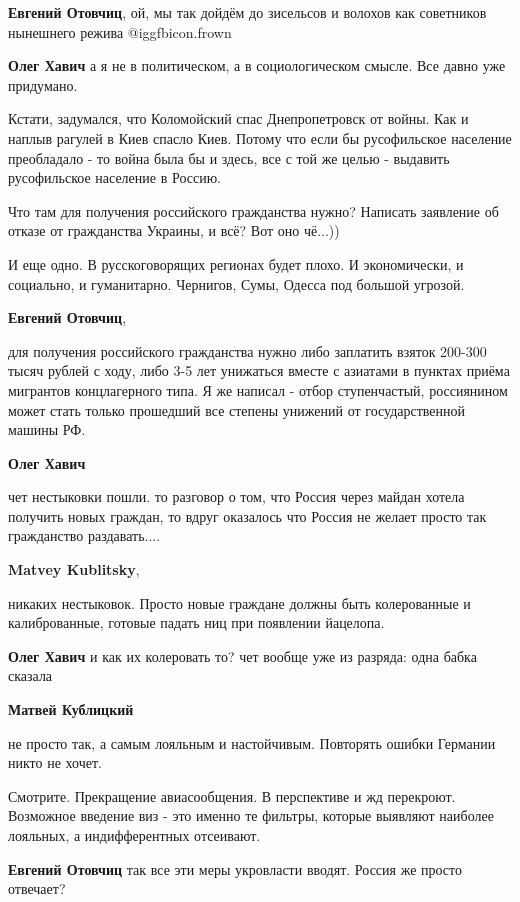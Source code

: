 \begin{itemize}
\begin{itemize}
\textbf{Евгений Отовчиц}, ой, мы так дойдём до зисельсов и волохов как советников нынешнего режива  @igg{fbicon.frown} 

\textbf{Олег Хавич} а я не в политическом, а в социологическом смысле. Все давно уже придумано.

Кстати, задумался, что Коломойский спас Днепропетровск от войны. Как и наплыв
рагулей в Киев спасло Киев. Потому что если бы русофильское население
преобладало - то война была бы и здесь, все с той же целью - выдавить
русофильское население в Россию.

Что там для получения российского гражданства нужно? Написать заявление об
отказе от гражданства Украины, и всё? Вот оно чё...))

И еще одно. В русскоговорящих регионах будет плохо. И экономически, и
социально, и гуманитарно. Чернигов, Сумы, Одесса под большой угрозой.

\textbf{Евгений Отовчиц}, 

для получения российского гражданства нужно либо заплатить взяток 200-300 тысяч
рублей с ходу, либо 3-5 лет унижаться вместе с азиатами в пунктах приёма
мигрантов концлагерного типа. Я же написал - отбор ступенчастый, россиянином
может стать только прошедший все степены унижений от государственной машины РФ.

\textbf{Олег Хавич} 

чет нестыковки пошли. то разговор о том, что Россия через майдан хотела
получить новых граждан, то вдруг оказалось что Россия не желает просто так
гражданство раздавать....

\textbf{Matvey Kublitsky}, 

никаких нестыковок. Просто новые граждане должны быть колерованные и
калиброванные, готовые падать ниц при появлении йацелопа.

\textbf{Олег Хавич} и как их колеровать то? чет вообще уже из разряда: одна бабка сказала

\textbf{Матвей Кублицкий} 

не просто так, а самым лояльным и настойчивым. Повторять ошибки Германии никто
не хочет.

Смотрите. Прекращение авиасообщения. В перспективе и жд перекроют. Возможное
введение виз - это именно те фильтры, которые выявляют наиболее лояльных, а
индифферентных отсеивают.

\textbf{Евгений Отовчиц} так все эти меры укровласти вводят. Россия же просто отвечает?


\end{itemize}
\end{itemize}
